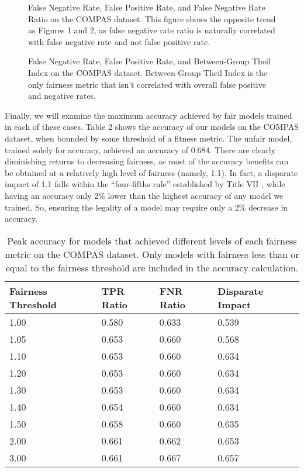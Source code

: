 \documentclass[10pt]{acmart}
\newcommand{\figures}[4]{
	\begin{figure}{
		\centering{
			\texttt{[image: \#1]}
		}
		\caption{#2}
		}
	\end{figure}
	\begin{figure} {
		\centering{
			\texttt{[image: \#3]}
		}
		\caption{#4}
	}
	\end{figure}
}
\begin{document}
\figures{FNR Ratio|COMPAS.png}{False Negative Rate, False Positive Rate, and False Negative Rate Ratio on the COMPAS dataset. This figure shows the opposite trend as Figures 1 and 2, as false negative rate ratio is naturally correlated with false negative rate and not false positive rate.}{Between-Group Theil Index|COMPAS.png}{False Negative Rate, False Positive Rate, and Between-Group Theil Index on the COMPAS dataset. Between-Group Theil Index is the only fairness metric that isn't correlated with overall false positive and negative rates.}

Finally, we will examine the maximum accuracy achieved by fair models trained in each of these cases. Table 2 shows the accuracy of our models on the COMPAS dataset, when bounded by some threshold of a fitness metric. The unfair model, trained solely for accuracy, achieved an accuracy of 0.684. There are clearly diminishing returns to decreasing fairness, as most of the accuracy benefits can be obtained at a relatively high level of fairness (namely, 1.1). In fact, a disparate impact of 1.1 falls within the “four-fifths rule” established by Title VII \citep{Barocas:2016}, while having an accuracy only 2\% lower than the highest accuracy of any model we trained. So, ensuring the legality of a model may require only a 2\% decrease in accuracy.

\renewcommand{\arraystretch}{1.5}
\begin{table}
	\begin{center}
	\begin{tabular}{| l | l | l | l |}
	\hline
	Fairness Threshold & TPR Ratio & FNR Ratio & Disparate Impact \\ \hline
	1.00  & 0.580 & 0.633 & 0.539 \\ \hline
	1.05  & 0.653 & 0.660 & 0.568 \\ \hline
	1.10  & 0.653 & 0.660 & 0.634 \\ \hline
	1.20  & 0.653 & 0.660 & 0.634 \\ \hline
	1.30  & 0.653 & 0.660 & 0.634 \\ \hline
	1.40  & 0.654 & 0.660 & 0.634 \\ \hline
	1.50  & 0.658 & 0.660 & 0.635 \\ \hline
	2.00  & 0.661 & 0.662 & 0.653 \\ \hline
	3.00  & 0.661 & 0.667 & 0.657 \\ \hline
	\end{tabular}
	\end{center}
\caption{Peak accuracy for models that achieved different levels of each fairness metric on the COMPAS dataset. Only models with fairness less than or equal to the fairness threshold are included in the accuracy calculation.}
\end{table}
\end{document}

